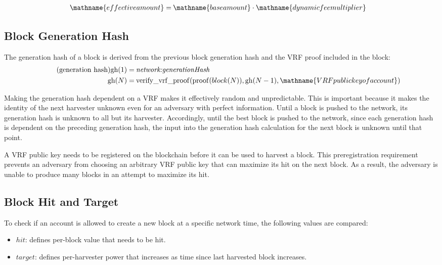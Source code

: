 \begin{align*}
	\mathname{effective amount} = \: & \mathname{base amount} \cdot \mathname{dynamic fee multiplier}
\end{align*}

\subsection{Block Generation Hash}

The generation hash of a block is derived from the previous block generation hash and the VRF proof included in the block:
\begin{align*}
	\tag{generation hash}
	\mathfunc{gh}(1) = \: & \nemsetting{network}{generationHash} \\
	\mathfunc{gh}(N) = \: & \mathfunc{verify\_vrf\_proof}(\mathfunc{proof}(block(N)), \mathfunc{gh}(N - 1), \mathname{VRF public key of account})
\end{align*}

Making the generation hash dependent on a VRF makes it effectively random and unpredictable.
This is important because it makes the identity of the next harvester unknown even for an adversary with perfect information.
Until a block is pushed to the network, its generation hash is unknown to all but its harvester.
Accordingly, until the best block is pushed to the network, since each generation hash is dependent on the preceding generation hash, the
input into the generation hash calculation for the next block is unknown until that point.

A VRF public key needs to be registered on the blockchain before it can be used to harvest a block.
This preregistration requirement prevents an adversary from choosing an arbitrary VRF public key that can maximize its hit on the next block.
As a result, the adversary is unable to produce many blocks in an attempt to maximize its hit.

\subsection{Block Hit and Target}
To check if an account is allowed to create a new block at a specific network time, the following values are compared:
\begin{itemize}
	\item{$hit$: defines per-block value that needs to be hit.}
	\item{$target$: defines per-harvester power that increases as time since last harvested block increases.}
\end{itemize}


